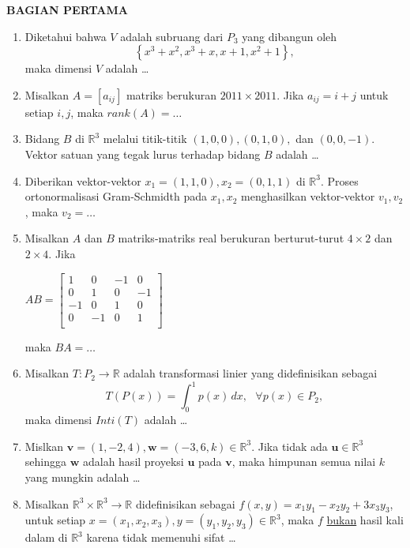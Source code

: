 \documentclass[12pt,twoside]{article}
\begin{document}
\textbf{BAGIAN PERTAMA}
\begin{enumerate}
	\item Diketahui bahwa $V$ adalah subruang dari $P_3$ yang dibangun oleh $$\left\lbrace x^3 + x^2, x^3+x, x+1, x^2+1 \right\rbrace,$$ maka dimensi $V$ adalah \dots
	\item Misalkan $A = [a_{ij}]$ matriks berukuran $2011 \times 2011.$ Jika $a_{ij} = i+j$ untuk setiap $i,j$, maka $rank(A) = \dots$

	\item Bidang $B$ di $\mathbb{R}^3 $ melalui titik-titik $(1,0,0),(0,1,0),$ dan $(0,0,-1)$. Vektor satuan yang tegak lurus terhadap bidang $B$ adalah \dots

	\item Diberikan vektor-vektor $x_1 = (1,1,0), x_2 = (0,1,1) $ di $\mathbb{R}^3$. Proses ortonormalisasi Gram-Schmidth pada $x_1, x_2$ menghasilkan vektor-vektor $v_1, v_2$, maka $v_2 = \dots$

	\item Misalkan $A$ dan $B$ matriks-matriks real berukuran berturut-turut $4 \times 2$ dan $2 \times 4$. Jika
	      \begin{center}
		      $AB = \left[ \begin{array}{cccc}
					      1  & 0  & -1 & 0  \\
					      0  & 1  & 0  & -1 \\
					      -1 & 0  & 1  & 0  \\
					      0  & -1 & 0  & 1  \\
				      \end{array} \right]$
	      \end{center}
	      maka $BA =\dots$

	\item Misalkan $T : P_2 \to \mathbb{R}$ adalah transformasi linier yang didefinisikan sebagai
	      \begin{equation*}
		      T(P(x)) = \displaystyle\int_{0}^{1} p(x) \,dx, ~~~ \forall p(x) \in P_2,
	      \end{equation*}
	      maka dimensi $Inti(T)$ adalah \dots

	\item Mislkan $\textbf{v} = (1,-2,4), \textbf{w}=(-3,6,k) \in \mathbb{R}^3$. Jika tidak ada $\textbf{u} \in \mathbb{R}^3$ sehingga $\textbf{w}$ adalah hasil proyeksi $\textbf{u}$ pada $\textbf{v}$, maka himpunan semua nilai $k$ yang mungkin adalah \dots

	\item Misalkan $\mathbb{R}^3 \times \mathbb{R}^3 \to \mathbb{R}$ didefinisikan sebagai $f(x,y) = x_1y_1 - x_2y_2 + 3x_3y_3$, untuk setiap $x = (x_1,x_2,x_3), y = (y_1,y_2,y_3) \in \mathbb{R}^3$, maka $f$ \underline{bukan} hasil kali dalam di $\mathbb{R}^3$ karena tidak memenuhi sifat \dots


\end{enumerate}
\end{document}
